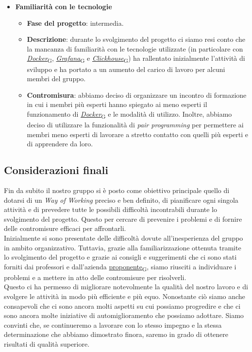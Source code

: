 \begin{itemize}
\begin{itemize}
    \end{itemize}
    \item \textbf{Familiarità con le tecnologie}
    \begin{itemize}
        \item \textbf{Fase del progetto}: intermedia.
        \item \textbf{Descrizione}: durante lo svolgimento del progetto ci siamo resi conto che la mancanza di familiarità con le tecnologie utilizzate (in particolare con \href{https://7last.github.io/docs/pb/documentazione-interna/glossario\#docker}{\textit{Docker}\textsubscript{G}}, \href{https://7last.github.io/docs/pb/documentazione-interna/glossario\#grafana}{\textit{Grafana}\textsubscript{G}} e \href{https://7last.github.io/docs/pb/documentazione-interna/glossario\#clickhouse}{\textit{Clickhouse}\textsubscript{G}}) ha rallentato inizialmente l'attività di sviluppo e ha portato a un aumento del carico di lavoro per alcuni membri del gruppo.
        \item \textbf{Contromisura}: abbiamo deciso di organizzare un incontro di formazione in cui i membri più esperti hanno spiegato ai meno esperti il funzionamento di \href{https://7last.github.io/docs/pb/documentazione-interna/glossario\#docker}{\textit{Docker}\textsubscript{G}} e le modalità di utilizzo. Inoltre, abbiamo deciso di utilizzare la funzionalità di \textit{pair programming} per permettere ai membri meno esperti di lavorare a stretto contatto con quelli più esperti e di apprendere da loro.
    \end{itemize}
\end{itemize}

\subsection{Considerazioni finali}
Fin da subito il nostro gruppo si è posto come obiettivo principale quello di dotarsi di un \textit{Way of Working} preciso e ben definito, di pianificare ogni singola attività e di prevedere tutte le possibili difficoltà incontrabili durante lo svolgimento del progetto. Questo per cercare di prevenire i problemi e di fornire delle contromisure efficaci per affrontarli. \\
Inizialmente si sono presentate delle difficoltà dovute all'inesperienza del gruppo in ambito organizzativo. Tuttavia, grazie alla familiarizzazione ottenuta tramite lo svolgimento del progetto e grazie ai consigli e suggerimenti che ci sono stati forniti dai professori e dall'azienda \href{https://7last.github.io/docs/pb/documentazione-interna/glossario\#proponente}{proponente\textsubscript{G}}, siamo riusciti a individuare i problemi e a mettere in atto delle contromisure per risolverli. \\
Questo ci ha permesso di migliorare notevolmente la qualità del nostro lavoro e di svolgere le attività in modo più efficiente e più equo. Nonostante ciò siamo anche consapevoli che ci sono ancora molti aspetti su cui possiamo progredire e che ci sono ancora molte iniziative di automiglioramento che possiamo adottare. Siamo convinti che, se continueremo a lavorare con lo stesso impegno e la stessa determinazione che abbiamo dimostrato finora, saremo in grado di ottenere risultati di qualità superiore.